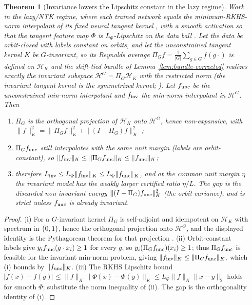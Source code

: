 \documentclass[11pt]{article}
\theoremstyle{plain}
\newtheorem{theorem}{Theorem}
\theoremstyle{definition}
\theoremstyle{remark}
\begin{document}
\begin{theorem}[Invariance lowers the Lipschitz constant in the lazy regime]\label{thm:lazy-cluster}
Work in the lazy/NTK regime, where each trained network equals the minimum-RKHS-norm interpolant of its fixed neural tangent kernel \citep{Jacot2018,Chizat2018}, with a smooth activation so that the tangent feature map $\Phi$ is $L_\Phi$-Lipschitz on the data ball \citep[Prop.~9]{BiettiMairalNTK2019}.  Let the data be orbit-closed with labels constant on orbits, and let the unconstrained tangent kernel $K$ be $G$-invariant, so its Reynolds average $\Pi_G f=\frac1{|G|}\sum_{g\in G}f(g\cdot)$ is defined on $\mathcal H_K$ and the shift-tied bundle of Lemma~\ref{lem:bundle-corrected} realizes exactly the invariant subspace $\mathcal H^G=\Pi_G\mathcal H_K$ with the restricted norm (the invariant tangent kernel is the symmetrized kernel; \citealp{HaasdonkBurkhardt2007}).  Let $f_{\rm unc}$ be the unconstrained min-norm interpolant and $f_{\rm inv}$ the min-norm interpolant in $\mathcal H^G$.  Then
\begin{enumerate}[leftmargin=1.7em,label=\textup{(\roman*)}]
\item $\Pi_G$ is the orthogonal projection of $\mathcal H_K$ onto $\mathcal H^G$, hence non-expansive, with $\|f\|_K^2=\|\Pi_G f\|_K^2+\|(I-\Pi_G)f\|_K^2$ \citep[Lemma~1]{Elesedy2021kernel};
\item $\Pi_G f_{\rm unc}$ still interpolates with the same unit margin (labels are orbit-constant), so $\|f_{\rm inv}\|_K\le\|\Pi_G f_{\rm unc}\|_K\le\|f_{\rm unc}\|_K$;
\item therefore $L_{\rm inv}\le L_\Phi\|f_{\rm inv}\|_K\le L_\Phi\|f_{\rm unc}\|_K$, and at the common unit margin $\eta$ the invariant model has the weakly larger certified ratio $\eta/L$.  The gap is the discarded non-invariant energy $\|(I-\Pi_G)f_{\rm unc}\|_K^2$ (the orbit-variance), and is strict unless $f_{\rm unc}$ is already invariant.
\end{enumerate}
\end{theorem}
\begin{proof}
(i) For a $G$-invariant kernel $\Pi_G$ is self-adjoint and idempotent on $\mathcal H_K$ with spectrum in $\{0,1\}$, hence the orthogonal projection onto $\mathcal H^G$, and the displayed identity is the Pythagorean theorem for that projection \citep[Lemma~1]{Elesedy2021kernel}.  (ii) Orbit-constant labels give $y_i f_{\rm unc}(g\cdot x_i)\ge1$ for every $g$, so $y_i(\Pi_G f_{\rm unc})(x_i)\ge1$; thus $\Pi_G f_{\rm unc}$ is feasible for the invariant min-norm problem, giving $\|f_{\rm inv}\|_K\le\|\Pi_G f_{\rm unc}\|_K$, which (i) bounds by $\|f_{\rm unc}\|_K$.  (iii) The RKHS Lipschitz bound $|f(x)-f(y)|\le\|f\|_K\|\Phi(x)-\Phi(y)\|_K\le L_\Phi\|f\|_K\|x-y\|_2$ \citep[Eq.~9]{BiettiMairalNTK2019} holds for smooth $\Phi$; substitute the norm inequality of (ii).  The gap is the orthogonality identity of (i).
\end{proof}
\end{document}
